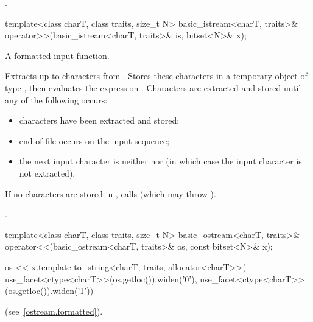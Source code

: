 \begin{itemdescr}
\pnum
\returns
{}.
\end{itemdescr}

%
\begin{itemdecl}
template<class charT, class traits, size_t N>
  basic_istream<charT, traits>&
    operator>>(basic_istream<charT, traits>& is, bitset<N>& x);
\end{itemdecl}

\begin{itemdescr}
\pnum
A formatted input function.

\pnum
\effects
Extracts up to  characters from .
Stores these characters in a temporary object  of type
,
then evaluates the expression
.
Characters are extracted and stored until any of the following occurs:

\begin{itemize}
\item
{} characters have been extracted and stored;
\item
end-of-file occurs on the input sequence;%
\item
the next input character is neither
nor
(in which case the input character is not extracted).
\end{itemize}

\pnum
If no characters are stored in , calls
(which may throw
).

\pnum
\returns
{}.
\end{itemdescr}

%
\begin{itemdecl}
template<class charT, class traits, size_t N>
  basic_ostream<charT, traits>&
    operator<<(basic_ostream<charT, traits>& os, const bitset<N>& x);
\end{itemdecl}

\begin{itemdescr}
\pnum
\returns
\begin{codeblock}
os << x.template to_string<charT, traits, allocator<charT>>(
  use_facet<ctype<charT>>(os.getloc()).widen('0'),
  use_facet<ctype<charT>>(os.getloc()).widen('1'))
\end{codeblock}
(see~\ref{ostream.formatted}).
\end{itemdescr}

